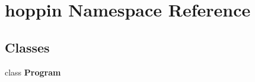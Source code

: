 \hypertarget{namespacehoppin}{}\section{hoppin Namespace Reference}
\label{namespacehoppin}
\subsection*{Classes}
\begin{DoxyCompactItemize}
\item 
class {\bfseries Program}
\end{DoxyCompactItemize}
